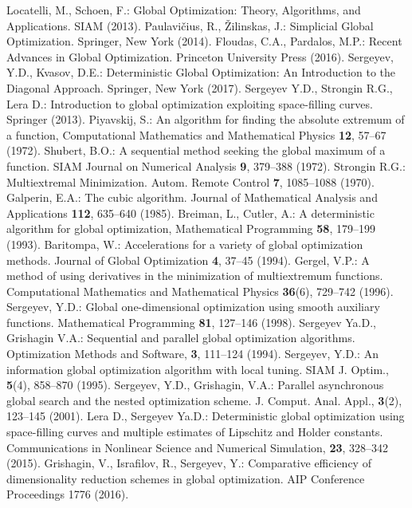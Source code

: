\documentclass[runningheads]{llncs}
\begin{document}
\begin{thebibliography}{1}
 Locatelli, M., Schoen, F.: Global Optimization: Theory, Algorithms, and Applications. SIAM (2013).
 Paulavi{\v c}ius, R., {\v Z}ilinskas, J.: Simplicial Global Optimization. Springer, New York (2014). 
 Floudas, C.A., Pardalos, M.P.: Recent Advances in Global Optimization. Princeton University Press (2016).
 Sergeyev, Y.D., Kvasov, D.E.: Deterministic Global Optimization: An Introduction to the Diagonal Approach. Springer, New York (2017). 
 Sergeyev Y.D., Strongin R.G., Lera D.: Introduction to global optimization exploiting space-filling curves. Springer (2013).
 Piyavskij, S.: An algorithm for finding the absolute extremum of a function, Computational Mathematics and Mathematical Physics \textbf{12}, 57--67 (1972).
 Shubert, B.O.: A sequential method seeking the global maximum of a function. SIAM Journal on Numerical Analysis \textbf{9}, 379--388 (1972).
 Strongin R.G.: Multiextremal Minimization. Autom. Remote Control \textbf{7}, 1085--1088 (1970).
 Galperin, E.A.: The cubic algorithm. Journal of Mathematical Analysis and Applications \textbf{112}, 635--640 (1985).
 Breiman, L., Cutler, A.: A deterministic algorithm for global optimization, Mathematical Programming \textbf{58}, 179--199 (1993).
 Baritompa, W.: Accelerations for a variety of global optimization methods. Journal of Global Optimization \textbf{4}, 37--45 (1994).
 Gergel, V.P.: A method of using derivatives in the minimization of multiextremum functions. Computational Mathematics and Mathematical Physics \textbf{36}(6), 729--742 (1996).
 Sergeyev, Y.D.: Global one-dimensional optimization using smooth auxiliary functions. Mathematical Programming \textbf{81}, 127--146 (1998).
 Sergeyev Ya.D., Grishagin V.A.: Sequential and parallel global optimization algorithms. Optimization Methods and Software, \textbf{3}, 111--124 (1994).
 Sergeyev, Y.D.: An information global optimization algorithm with local tuning. SIAM J. Optim., \textbf{5}(4), 858--870 (1995).
 Sergeyev, Y.D., Grishagin, V.A.: Parallel asynchronous global search and the nested optimization scheme. J. Comput. Anal. Appl., \textbf{3}(2), 123--145 (2001).
 Lera D., Sergeyev Ya.D.: Deterministic global optimization using space-filling curves and multiple estimates of Lipschitz and Holder constants. Communications in Nonlinear Science and Numerical Simulation, \textbf{23}, 328--342 (2015).
 Grishagin, V., Israfilov, R., Sergeyev, Y.: Comparative efficiency of dimensionality reduction schemes in global optimization. AIP Conference Proceedings 1776 (2016).

\end{thebibliography}
\end{document}
